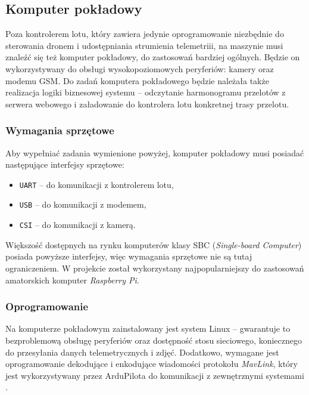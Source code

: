 \subsection{Komputer pokładowy}

Poza kontrolerem lotu, który zawiera jedynie oprogramowanie 
niezbędnie do sterowania dronem i udostępniania
strumienia telemetriii, na maszynie musi znaleźć się też komputer pokładowy, 
do zastosowań bardziej ogólnych. Będzie on wykorzystywany do
obsługi wysokopoziomowych peryferiów: kamery oraz modemu GSM. Do zadań
komputera pokładowego będzie należała także realizacja logiki biznesowej systemu
-- odczytanie harmonogramu przelotów z serwera webowego i załadowanie do kontrolera lotu
konkretnej trasy przelotu.

\subsubsection{Wymagania sprzętowe}

Aby wypełniać zadania wymienione powyżej, komputer pokładowy musi
posiadać następujące interfejsy sprzętowe:

\begin{itemize}
	\item \texttt{UART} -- do komunikacji z kontrolerem lotu,
	\item \texttt{USB} -- do komunikacji z modemem,
	\item \texttt{CSI} -- do komunikacji z kamerą.
\end{itemize}

Większość dostępnych na rynku komputerów klasy SBC (\textit{Single-board Computer})
posiada powyższe interfejsy, więc wymagania sprzętowe nie są tutaj ograniczeniem.
W projekcie został wykorzystany najpopularniejszy do zastosowań amatorskich
komputer \textit{Raspberry Pi}. 

\subsubsection{Oprogramowanie}

Na komputerze pokładowym zainstalowany jest system Linux -- gwarantuje to bezproblemową
obsługę peryferiów oraz dostępność stosu sieciowego, koniecznego do przesyłania 
danych telemetrycznych i zdjęć.
Dodatkowo, wymagane jest oprogramowanie dekodujące
i enkodujące wiadomości protokołu \textit{MavLink}, który jest wykorzystywany przez 
ArduPilota do komunikacji z zewnętrznymi systemami \cite{ardupilot_mavlink}.

